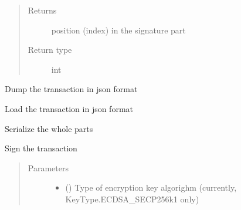 \documentclass[letterpaper,10pt,english]{sphinxmanual}
\begin{document}
\begin{fulllineitems}
\begin{fulllineitems}
\begin{quote}
\begin{description}
\item[{Returns}] \leavevmode
position (index) in the signature part

\item[{Return type}] \leavevmode
int

\end{description}\end{quote}

\end{fulllineitems}


\begin{fulllineitems}
\label{\detokenize{bbc1.core.bbclib:bbc1.core.bbclib.BBcTransaction.jsondump}}
Dump the transaction in json format

\end{fulllineitems}


\begin{fulllineitems}
\label{\detokenize{bbc1.core.bbclib:bbc1.core.bbclib.BBcTransaction.jsonload}}
Load the transaction in json format

\end{fulllineitems}


\begin{fulllineitems}
\label{\detokenize{bbc1.core.bbclib:bbc1.core.bbclib.BBcTransaction.serialize}}
Serialize the whole parts

\end{fulllineitems}


\begin{fulllineitems}
\label{\detokenize{bbc1.core.bbclib:bbc1.core.bbclib.BBcTransaction.sign}}
Sign the transaction
\begin{quote}\begin{description}
\item[{Parameters}] \leavevmode\begin{itemize}
\item {} 
 () \textendash{} Type of encryption key algorighm (currently, KeyType.ECDSA\_SECP256k1 only)


\end{itemize}
\end{description}
\end{quote}
\end{fulllineitems}
\end{fulllineitems}
\end{document}

